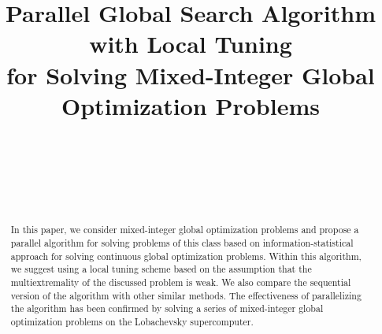 \documentclass[
11pt,%
tightenlines,%
twoside,%
onecolumn,%
nofloats,%
nobibnotes,%
nofootinbib,%
superscriptaddress,%
noshowpacs,%
centertags]%
{revtex4}
\begin{document}

\title{Parallel Global Search Algorithm with Local Tuning\\ 
for Solving Mixed-Integer Global Optimization Problems}

\author{~}

\author{~}

\author{~}




\begin{abstract} %
In this paper, we consider mixed-integer global optimization problems and propose a parallel algorithm for solving problems of this class based on information-statistical approach for solving continuous global optimization problems. Within this algorithm, we suggest using a local tuning scheme based on the assumption that the multiextremality of the discussed problem is weak. 
We also compare the sequential version of the algorithm with other similar methods.
The effectiveness of parallelizing the algorithm has been confirmed by solving a series of mixed-integer global optimization problems on the Lobachevsky supercomputer.
\end{abstract}

\end{document}

